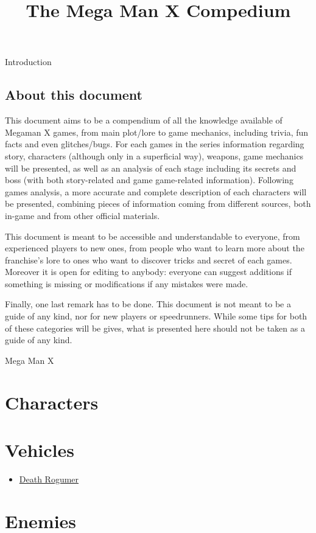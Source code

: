 \documentclass[openany]{report}
\title{The Mega Man X Compedium}
\begin{document}
\maketitle
\tableofcontents

\begin{chapter}{Introduction}
	\section{About this document}
	This document aims to be a compendium of all the knowledge available of Megaman X games, from main plot/lore to game mechanics, including trivia, fun facts and even glitches/bugs. For each games in the series information regarding story, characters (although only in a superficial way), weapons, game mechanics will be presented, as well as an analysis of each stage including its secrets and boss (with both story-related and game game-related information). Following games analysis, a more accurate and complete description of each characters will be presented, combining pieces of information coming from different sources, both in-game and from other official materials.
	
	This document is meant to be accessible and understandable to everyone, from experienced players to new ones, from people who want to learn more about the franchise's lore to ones who want to discover tricks and secret of each games. Moreover it is open for editing to anybody: everyone can suggest additions if something is missing or modifications if any mistakes were made.
	
	Finally, one last remark has to be done. This document is not meant to be a guide of any kind, nor for new players or speedrunners. While some tips for both of these categories will be gives, what is presented here should not be taken as a guide of any kind.
\end{chapter}

\begin{chapter}{Mega Man X}
	
\end{chapter}



\begin{appendices}
	\chapter {Characters}
	\chapter {Vehicles}
	\begin{itemize}
		\item \hyperlink{veichle:Death Rogumer}{Death Rogumer}
	\end{itemize}
	
	\chapter{Enemies}
	
\end{appendices}

 

\end{document}
